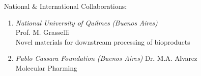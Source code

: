 

National \& International Collaborations:
\begin{enumerate}
\item {\sl National University of Quilmes (Buenos Aires)} \\ Prof.  M. Grasselli \\ Novel materials for downstream processing of bioproducts
\item {\sl Pablo Cassara Foundation (Buenos Aires)}  Dr. M.A. Alvarez \\ Molecular Pharming
\end{enumerate}


\nocite{Fernandez-Lahore1,Fernandez-Lahore2,Fernandez-Lahore3,Fernandez-Lahore4,Fernandez-Lahore5,Fernandez-Lahore6,Fernandez-Lahore7}